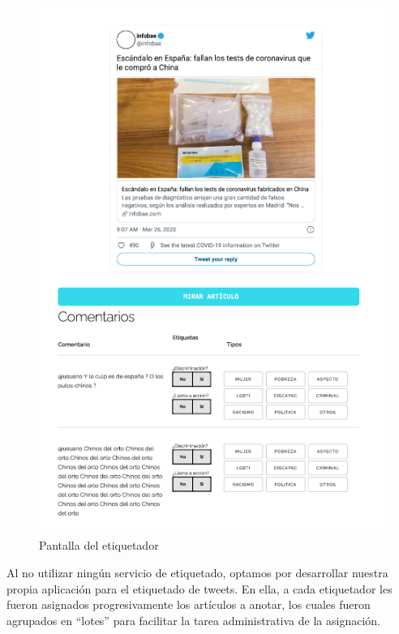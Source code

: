 
\begin{figure}
    \centering
    \includegraphics[width=\textwidth]{img/labeler.pdf}
    \caption{Pantalla del etiquetador}
    \label{fig:labeler_example}
\end{figure}

Al no utilizar ningún servicio de etiquetado, optamos por desarrollar nuestra propia aplicación para el etiquetado de tweets. En ella, a cada etiquetador les fueron asignados progresivamente los artículos a anotar, los cuales fueron agrupados en ``lotes'' para facilitar la tarea administrativa de la asignación.

